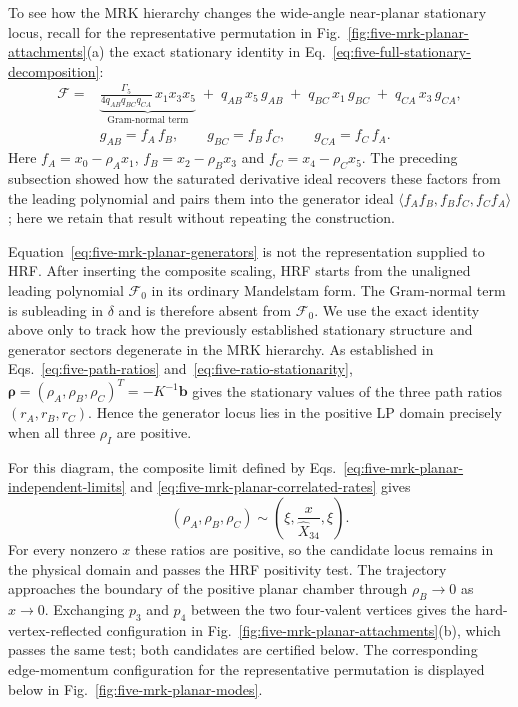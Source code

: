 \documentclass[a4paper,11pt]{article}
\begin{document}
To see how the MRK hierarchy changes the wide-angle near-planar stationary
locus, recall for the representative permutation in
Fig.~\ref{fig:five-mrk-planar-attachments}(a) the exact stationary identity
in Eq.~\eqref{eq:five-full-stationary-decomposition}:
\begin{align}
 \mathcal F={}&
 \underbrace{\frac{\Gamma_5}{4q_{AB}q_{BC}q_{CA}}\,x_1x_3x_5}
 _{\text{Gram-normal term}}
 \; + \;q_{AB}\,x_5\,g_{AB}
 \; + \;q_{BC}\,x_1\,g_{BC}
 \; + \;q_{CA}\,x_3\,g_{CA},
 \nonumber\\[-1mm]
 &g_{AB}=f_A\,f_B,\qquad
  g_{BC}=f_B\,f_C,\qquad
  g_{CA}=f_C\,f_A.
 \label{eq:five-mrk-planar-generators}
\end{align}
Here
\(f_A=x_0-\rho_Ax_1\), \(f_B=x_2-\rho_Bx_3\) and
\(f_C=x_4-\rho_Cx_5\).  The preceding subsection showed how the saturated
derivative ideal recovers these factors from the leading polynomial and
pairs them into the generator ideal
\(\langle f_Af_B,f_Bf_C,f_Cf_A\rangle\); here we retain that result without
repeating the construction.

Equation~\eqref{eq:five-mrk-planar-generators} is not the representation
supplied to HRF.  After inserting the composite scaling, HRF starts from the
unaligned leading polynomial \(\mathcal F_0\) in its ordinary Mandelstam
form.  The Gram-normal term is subleading in \(\delta\) and is therefore
absent from \(\mathcal F_0\).  We use the exact identity above only to track
how the previously established stationary structure and generator sectors
degenerate in the MRK hierarchy.  As established in
Eqs.~\eqref{eq:five-path-ratios} and~\eqref{eq:five-ratio-stationarity},
\(\boldsymbol\rho=(\rho_A,\rho_B,\rho_C)^T=-K^{-1}\boldsymbol b\) gives the
stationary values of the three path ratios
\((r_A,r_B,r_C)\).  Hence the generator locus lies in the positive LP
domain precisely when all three \(\rho_I\) are positive.

For this diagram, the composite limit defined by
Eqs.~\eqref{eq:five-mrk-planar-independent-limits} and
\eqref{eq:five-mrk-planar-correlated-rates} gives
\begin{equation}
 (\rho_A,\rho_B,\rho_C)
 \sim\left(\xi,\frac{x}{\widehat X_{34}},\xi\right).
 \label{eq:five-mrk-planar-ratios}
\end{equation}
For every nonzero \(x\) these ratios are positive, so the candidate locus
remains in the physical domain and passes the HRF positivity test.  The
trajectory approaches the boundary of the positive planar chamber through
\(\rho_B\to0\) as \(x\to0\).  Exchanging
\(p_3\) and \(p_4\) between the two four-valent vertices gives the
hard-vertex-reflected configuration in
Fig.~\ref{fig:five-mrk-planar-attachments}(b), which passes the same test;
both candidates are certified below.
The corresponding edge-momentum configuration for the representative
permutation is displayed below in Fig.~\ref{fig:five-mrk-planar-modes}.
\end{document}
